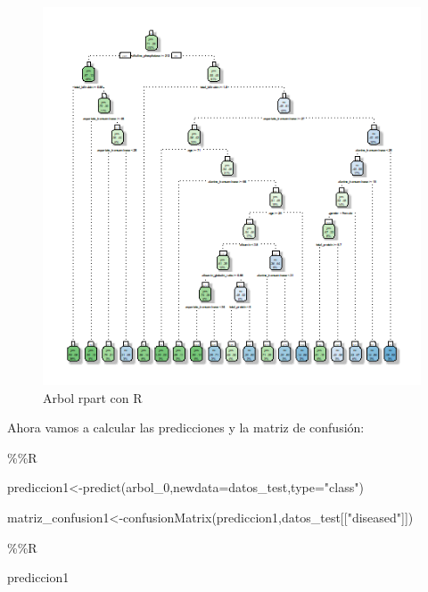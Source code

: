 \documentclass[
  11pt,
  a4paper,
]{article}
\newenvironment{Shaded}{\begin{snugshade}}{\end{snugshade}}
\newcommand{\AttributeTok}[1]{\textcolor[rgb]{0.77,0.63,0.00}{#1}}
\newcommand{\FunctionTok}[1]{\textcolor[rgb]{0.00,0.00,0.00}{#1}}
\newcommand{\NormalTok}[1]{#1}
\newcommand{\OtherTok}[1]{\textcolor[rgb]{0.56,0.35,0.01}{#1}}
\newcommand{\SpecialCharTok}[1]{\textcolor[rgb]{0.00,0.00,0.00}{#1}}
\newcommand{\StringTok}[1]{\textcolor[rgb]{0.31,0.60,0.02}{#1}}
\begin{document}
\begin{figure}
\centering
\includegraphics{output_222_0.png}
\caption{Arbol rpart con R}
\end{figure}

\newpage

Ahora vamos a calcular las predicciones y la matriz de confusión:

\begin{Shaded}
\begin{Highlighting}[]
\SpecialCharTok{\%\%}\NormalTok{R}

\NormalTok{prediccion1}\OtherTok{\textless{}{-}}\FunctionTok{predict}\NormalTok{(arbol\_0,}\AttributeTok{newdata=}\NormalTok{datos\_test,}\AttributeTok{type=}\StringTok{"class"}\NormalTok{)}

\NormalTok{matriz\_confusion1}\OtherTok{\textless{}{-}}\FunctionTok{confusionMatrix}\NormalTok{(prediccion1,datos\_test[[}\StringTok{"diseased"}\NormalTok{]])}
\end{Highlighting}
\end{Shaded}

\begin{Shaded}
\begin{Highlighting}[]
\SpecialCharTok{\%\%}\NormalTok{R}

\NormalTok{prediccion1}
\end{Highlighting}
\end{Shaded}
\end{document}
